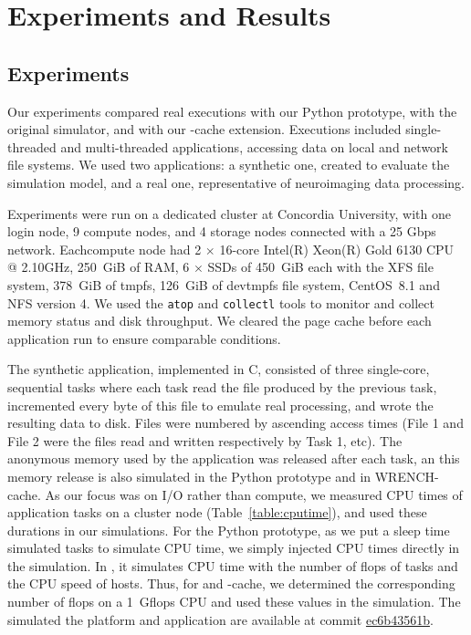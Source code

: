 \chapter{Experiments and Results}
\label{experiment}

\section{Experiments}

Our experiments compared real executions with our Python prototype, with the 
original \wrench simulator, and with our \wrench-cache extension. 
Executions included single-threaded and multi-threaded applications, 
accessing data on local and network file systems. 
We used two applications: a synthetic one, created to evaluate the simulation model, 
and a real one, representative of neuroimaging data processing.

Experiments were run on a dedicated cluster at Concordia University, with one 
login node, 9 compute nodes, and 4 storage nodes connected with a 25 Gbps network. 
Eachcompute node had 2 $\times$ 16-core Intel(R) Xeon(R) Gold 6130 CPU @ 2.10GHz, 
250~GiB of RAM, 6 $\times$ SSDs of 450~GiB each with the XFS file system, 
378~GiB of tmpfs, 126~GiB of devtmpfs file system, CentOS~8.1 and NFS version 4. 
We used the \texttt{atop} and \texttt{collectl} tools to monitor and collect memory status
and disk throughput. 
We cleared the page cache before each application run to ensure comparable conditions.
    
The synthetic application, implemented in C, consisted of three single-core,
sequential tasks where each task read the file produced by the previous task, 
incremented every byte of this file to emulate real processing, 
and wrote the resulting data to disk. 
Files were numbered by ascending access times (File 1 and File 2 were the files 
read and written respectively by Task 1, etc).
The anonymous memory used by the application was released after each task, 
an this memory release is also simulated in the Python prototype and 
in WRENCH-cache. 
As our focus was on I/O rather than compute, we measured CPU times 
of application tasks on a cluster node (Table~\ref{table:cputime}), and 
used these durations in our simulations. 
For the Python prototype, as we put a sleep time simulated tasks to 
simulate CPU time, we simply injected CPU times directly in the simulation. 
In \wrench, it simulates CPU time with the number of flops of tasks 
and the CPU speed of hosts.
Thus, for \wrench and \wrench-cache, we determined the corresponding 
number of flops on a 1~Gflops CPU and used these values in the simulation. 
The simulated the platform and application are available at commit 
\href{https://github.com/wrench-project/wrench/tree/ec6b43561b95977002258c0fe37a4ecad8f1d33f/examples/basic-examples/io-pagecache}{ec6b43561b}.

